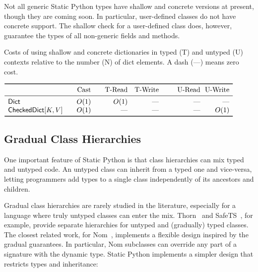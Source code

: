 \documentclass[english,cleveref,crc]{programming}
\newcommand{\SP}{Static Python}
\newcommand{\typefont}[1]{\mathsf{#1}}
\newcommand{\paramtype}[2]{#1[#2]}
\newcommand{\sptrawpydict}{\typefont{Dict}}
\newcommand{\sptrawchkdict}{\typefont{CheckedDict}} %
\newcommand{\sptchkdict}[2]{\paramtype{\sptrawchkdict}{#1, #2}}
\begin{document}
Not all generic \SP{} types have shallow and concrete versions at present,
though they are coming soon.
In particular, user-defined classes do not have concrete support.
The shallow check for a user-defined class does, however, guarantee the types
of all non-generic fields and methods.

\begin{table}[t]
  \newcommand{\nocost}{\textrm{---}}
  \caption{Costs of using shallow and concrete dictionaries in typed (T) and untyped (U) contexts relative to the number (N) of dict elements. A dash (\nocost{}) means zero cost.}
  \label{t:shallow-vs-concrete}

  \centering
  \(\begin{array}{l@{\qquad}r@{\qquad}rr@{~~}@{\qquad}r@{~~}r}
    \toprule
                                        & \mbox{Cast} & \mbox{T-Read} & \mbox{T-Write} & \mbox{U-Read} & \mbox{U-Write} \\\midrule
    \sptrawpydict                       &        O(1) &          O(1) &      \nocost{} &     \nocost{} &      \nocost{} \\
    \sptchkdict{K}{V}                   &        O(1) &     \nocost{} &      \nocost{} &     \nocost{} &           O(1) \\
    \bottomrule
  \end{array}\)
\end{table}



\subsection{Gradual Class Hierarchies}
\label{s:inheritance}

One important feature of \SP{} is that class hierarchies can
mix typed and untyped code.
An untyped class can inherit from a typed one and vice-versa,
letting programmers add types to a single class independently of its ancestors
and children.


Gradual class hierarchies are rarely studied in the literature, especially
for a language where truly untyped classes can enter the mix.
Thorn~\cite{wzlov-popl-2010} and SafeTS~\cite{rsfbv-popl-2015}, for example,
provide separate hierarchies for untyped and (gradually) typed classes.
The closest related work, for Nom~\cite{mt-oopsla-2017}, implements
a flexible design inspired by the gradual guarantees.
In particular, Nom subclasses can override any part of a signature with the
dynamic type.
\SP{} implements a simpler design that restricts types and
inheritance:
\end{document}
